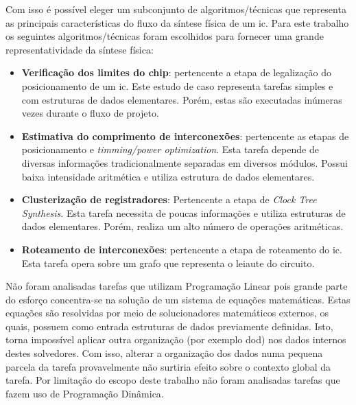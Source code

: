 Com isso é possível eleger um subconjunto de algoritmos/técnicas que representa as principais características do fluxo da síntese física de um \ac{ic}.
Para este trabalho os seguintes algoritmos/técnicas foram escolhidos para fornecer uma grande representatividade da síntese física:
\begin{itemize}
    \itemsep0em
    \item \textbf{Verificação dos limites do chip}: pertencente a etapa de legalização do posicionamento de um \ac{ic}. Este estudo de caso representa tarefas simples e com estruturas de dados elementares. Porém, estas são executadas inúmeras vezes durante o fluxo de projeto.
    \item \textbf{Estimativa do comprimento de interconexões}: pertencente as etapas de posicionamento e \textit{timming/power optimization}. Esta tarefa depende de diversas informações 
    tradicionalmente separadas em diversos módulos. Possui baixa intensidade aritmética e utiliza estrutura de dados elementares.
    \item \textbf{Clusterização de registradores}: Pertencente a etapa de \textit{Clock Tree Synthesis}. Esta tarefa necessita de poucas informações e utiliza estruturas de dados elementares. Porém, realiza um alto número de operações aritméticas. 
    \item \textbf{Roteamento de interconexões}: pertencente a etapa de roteamento do \ac{ic}. Esta tarefa opera sobre um grafo que representa o leiaute do circuito.
\end{itemize}

Não foram analisadas tarefas que utilizam Programação Linear pois grande parte do esforço concentra-se na solução de um sistema de equações matemáticas.
Estas equações são resolvidas por meio de solucionadores matemáticos externos, os quais, possuem como entrada estruturas de dados previamente definidas.
Isto, torna impossível aplicar outra organização (por exemplo \ac{dod}) nos dados internos destes solvedores.
Com isso, alterar a organização dos dados numa pequena parcela da tarefa provavelmente não surtiria efeito sobre o contexto global da tarefa.
Por limitação do escopo deste trabalho não foram analisadas tarefas que fazem uso de Programação Dinâmica.
